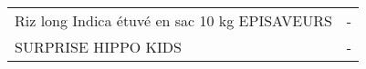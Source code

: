 \begin{longtable}{p{5cm}p{10cm}}
                                                            Riz long Indica étuvé en sac 10 kg EPISAVEURS &                                                                                                                                                                                                                                                                                                                                                                                                                                                                                                                                                                                                                                                                                                                                                                                                                                                                                                                                                                                                                                        - \\
                                                                                      SURPRISE HIPPO KIDS &                                                                                                                                                                                                                                                                                                                                                                                                                                                                                                                                                                                                                                                                                                                                                                                                                                                                                                                                                                                                                                        - \\

\end{longtable}
